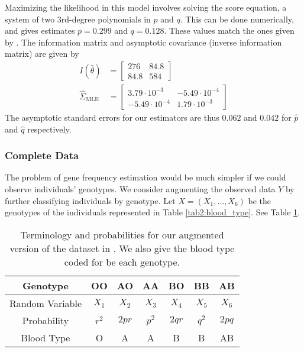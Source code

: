 \documentclass[11pt, oneside]{article}   	%
\begin{document}
Maximizing the likelihood in this model involves solving the score equation, a system of two 3rd-degree polynomials in $p$ and $q$. This can be done numerically, and gives estimates $p = 0.299$ and $q = 0.128$. These values match the ones given by \citet{Fuj78}. The information matrix and asymptotic covariance (inverse information matrix) are given by
%
\begin{align}
    I(\hat{\theta}) &= \begin{bmatrix}
        276 & 84.8\\
        84.8 & 584
    \end{bmatrix}\\
    \hat{\Sigma}_\mathrm{MLE} &= \begin{bmatrix}
        3.79 \cdot 10^{-3} & -5.49 \cdot 10^{-4}\\
        -5.49 \cdot 10^{-4} & 1.79 \cdot 10^{-3}
    \end{bmatrix} \label{eq:obs_lik_SE}
\end{align}
%
The asymptotic standard errors for our estimators are thus $0.062$ and $0.042$ for $\hat{p}$ and $\hat{q}$ respectively.

\subsubsection{Complete Data}

The problem of gene frequency estimation would be much simpler if we could observe individuals' genotypes. We consider augmenting the observed data $Y$ by further classifying individuals by genotype. Let $X = (X_1, \ldots, X_6)$ be the genotypes of the individuals represented in Table \ref{tab2:blood_type}. See Table \ref{tab2:blood_type_complete}.

\begin{table}
    \centering
    \caption{Terminology and probabilities for our augmented version of the dataset in \citet{Fuj78}. We also give the blood type coded for be each genotype.}
    \begin{tabular}{c|cccccc}
        Genotype & OO & AO & AA & BO & BB & AB\\
        \hline
        Random Variable & $X_1$ & $X_2$ & $X_3$ & $X_4$ & $X_5$ & $X_6$\\
        Probability & $r^2$ & $2pr$ & $p^2$ & $2qr$ & $q^2$ & $2pq$\\
        Blood Type & O & A & A & B & B & AB
    \end{tabular}
    
    \label{tab2:blood_type_complete}
\end{table}
\end{document}
